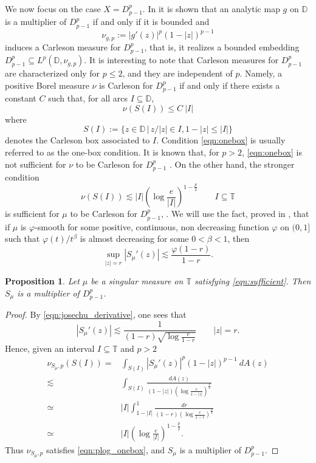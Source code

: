 \documentclass{birkjour}
\numberwithin{equation}{section}
\theoremstyle{plain}
\newtheorem{prop}[theo]{Proposition}
\theoremstyle{definition}
\newcommand{\T}{\mathbb{T}}
\newcommand{\D}{\mathbb{D}}
\newcommand{\1}{\mathds{1}}
\begin{document}
We now focus on the case $X=D^p_{p-1}$. In \cite{Wu99} it is shown that an analytic map $g$ on $\D$ is a multiplier of $D^p_{p-1}$ if and only if it is bounded and $$\nu_{g, p}:=|g'(z)|^p(1-|z|)^{p-1}$$ induces a Carleson measure for $D^p_{p-1}$, that is, it realizes a bounded embedding $D^p_{p-1}\subseteq L^p(\D, \nu_{g, p})$. It is interesting to note that Carleson measures for $D^p_{p-1}$ are characterized only for $p\le2$, and they are independent of $p$. Namely, a positive Borel measure $\nu$ is Carleson for $D^p_{p-1}$ if and only if there exists a constant $C$ such that, for all arcs $I\subseteq\D$,
\[
\nu(S(I))\leq C~|I|
\]
where 
\begin{equation}
\label{eqn:onebox}
S(I):=\{z\in\D\,|\, z/|z|\in I, 1-|z|\le|I| \}
\end{equation}
denotes the Carleson box associated to $I$. Condition \eqref{eqn:onebox} is usually referred to as the one-box condition. It is known that, for $p>2$, \eqref{eqn:onebox} is not sufficient for $\nu$ to be Carleson for $D^p_{p-1}$ \cite{Girela06JFA}. On the other hand, the stronger condition
\begin{equation}
\label{eqn:plog_onebox}
\nu(S(I))\lesssim |I|\left(\log\frac{e}{|I|}\right)^{1-\frac{p}{2}}\qquad I\subseteq\T
\end{equation}
is sufficient for $\mu$ to be Carleson for $D^p_{p-1}$, \cite{Pelaez14}. We will use the fact, proved in \cite[Lemma 4]{Anderson91}, that if $\mu$ is $\varphi$-smooth for some  positive, continuous, non decreasing function $\varphi$ on $(0, 1]$ such that $\varphi(t)/t^\beta$ is almost decreasing for some $0<\beta<1$, then 
\begin{equation}
\label{eqn:josechu_derivative}
\sup_{|z|=r}|S_\mu'(z)|\lesssim \frac{\varphi(1-r)}{1-r}.
\end{equation}
\begin{prop}
\label{prop:multiplier}
    Let $\mu$ be a singular measure on $\T$ satisfying \eqref{eqn:sufficient}. Then $S_\mu$ is a multiplier of $D^p_{p-1}$.
\end{prop}
\begin{proof}
By \eqref{eqn:josechu_derivative},  one sees that 
\[
|S_\mu'(z)|\lesssim \frac{1}{(1-r)\sqrt{\log\frac{e}{1-r}}}\qquad |z|=r.
\]
Hence, given an interval $I\subseteq\T$ and $p>2$
\[
\begin{split}
\nu_{S_\mu, p}(S(I))=&\int_{S(I)}|S_\mu'(z)|^p(1-|z|)^{p-1}~dA(z)\\
\lesssim&\int_{S(I)}\frac{dA(z)}{(1-|z|)\left(\log\frac{e}{1-|z|}\right)^\frac{p}{2}}\\
\simeq&|I|\int_{1-|I|}^1\frac{dr}{(1-r)\left(\log\frac{e}{1-r}\right)^\frac{p}{2}}\\
\simeq&|I|\left(\log\frac{e}{|I|}\right)^{1-\frac{p}{2}}.
\end{split}
\]
Thus $\nu_{S_\mu, p}$ satisfies \eqref{eqn:plog_onebox}, and $S_\mu$ is a multiplier of $D^p_{p-1}$.
\end{proof}
\end{document}
